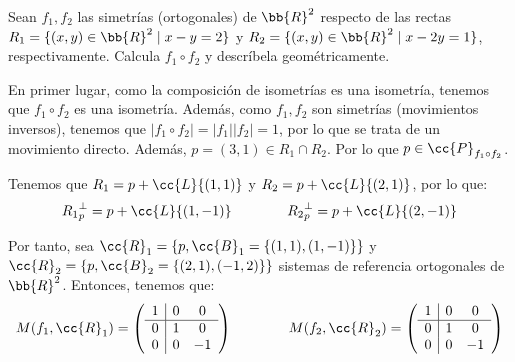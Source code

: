 \begin{ejercicio}
    Sean $f_1, f_2$ las simetrías (ortogonales) de $\bb{R}^2$ respecto de las rectas $R_1 = \{(x, y) \in \bb{R}^2 \mid x - y = 2\}$ y $R_2=\{(x, y) \in \bb{R}^2 \mid x - 2y = 1\}$, respectivamente. Calcula $f_1 \circ f_2$ y descríbela geométricamente.

    \begin{figure}[H]
        \centering
    \end{figure}

    En primer lugar, como la composición de isometrías es una isometría, tenemos que $f_1\circ f_2$ es una isometría.
    Además, como $f_1,f_2$ son simetrías (movimientos inversos), tenemos que $|f_1\circ f_2| = |f_1||f_2| = 1$, por lo que se trata de un movimiento directo.
    Además, $p=(3,1)\in R_1\cap R_2$. Por lo que $p\in \cc{P}_{f_1\circ f_2}$.

    Tenemos que $R_1 = p+\cc{L}\{(1,1)\}$ y $R_2 = p+\cc{L}\{(2,1)\}$, por lo que:
    \begin{equation*}
        {R_1}_p^\perp = p+\cc{L}\{(1,-1)\} \qquad \qquad {R_2}_p^\perp = p+\cc{L}\{(2,-1)\}
    \end{equation*}

    Por tanto, sea $\cc{R}_1 = \{p, \cc{B}_1 = \{(1,1), (1,-1)\}\}$ y $\cc{R}_2 = \{p, \cc{B}_2 = \{(2,1), (-1,2)\}\}$ sistemas de referencia ortogonales de $\bb{R}^2$. Entonces, tenemos que:
    \begin{equation*}
        M(f_1,\cc{R}_1) = \left(\begin{array}{c|cc}
            1 & 0 & 0 \\ \hline
            0 & 1 & 0 \\
            0 & 0 & -1
        \end{array}\right)
        \qquad \qquad
        M(f_2,\cc{R}_2) = \left(\begin{array}{c|cc}
            1 & 0 & 0 \\ \hline
            0 & 1 & 0 \\
            0 & 0 & -1
        \end{array}\right)
    \end{equation*}


\end{ejercicio}

